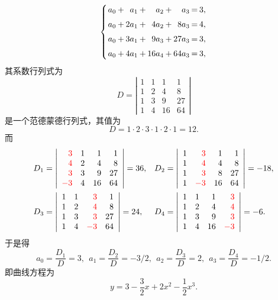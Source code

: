 \documentclass[10pt,a4paper%
tablecaptionabove]{article}
\newcommand{\red}{\textcolor{red}}
\begin{document}
\begin{CJK}{UTF8}{gkai}
\begin{jie}
      $$
      \setlength{\arraycolsep}{1.0pt}
      \left\{
      \begin{array}{rcrcrcrcr}
        a_0 & + &  a_1 & + &  a_2 & + &   a_3 & = & 3, \\[0.2cm]
        a_0 & + & 2a_1 & + & 4a_2 & + &  8a_3 & = & 4, \\[0.2cm]
        a_0 & + & 3a_1 & + & 9a_3 & + & 27a_3 & = & 3, \\[0.2cm]
        a_0 & + & 4a_1 & + &16a_4 & + & 64a_3 & = & 3,
      \end{array}
      \right.
      $$
      其系数行列式为
      $$
      D = \left|
      \begin{array}{rrrr}
        1 & 1 &  1 &  1 \\
        1 & 2 &  4 &  8 \\
        1 & 3 &  9 & 27 \\
        1 & 4 & 16 & 64
      \end{array}
      \right|
      $$
      是一个范德蒙德行列式，其值为
      $$ 
      D = 1\cdot 2 \cdot 3 \cdot 1 \cdot 2 \cdot 1 = 12.
      $$
      而
      $$
    \begin{array}{ll}
      D_1 = \left|
      \begin{array}{rrrr}
        \red{3}  &  1 &  1 &  1\\
        \red{4}  &  2 &  4 &  8\\
        \red{3}  &  3 &  9 & 27\\
        \red{-3} &  4 & 16 & 64
      \end{array}
      \right|= 36, &
      D_2 = \left|
      \begin{array}{rrrr}
        1 & \red{3}  & 1  &  1\\
        1 & \red{4}  & 4  &  8\\
        1 & \red{3}  & 8  &  27\\
        1 & \red{-3} & 16 &  64
      \end{array}
      \right|=-18,\\[0.8cm]
      D_3 = \left|
      \begin{array}{rrrr}
        1 & 1 & \red{3}  &  1 \\
        1 & 2 & \red{4}  &  8 \\
        1 & 3 & \red{3}  & 27 \\
        1 & 4 & \red{-3} & 64
      \end{array}
      \right|= 24, &
      D_4 = \left|
      \begin{array}{rrrr}
        1 & 1 &  1 & \red{3} \\
        1 & 2 &  4 & \red{4} \\
        1 & 3 &  9 & \red{3} \\
        1 & 4 & 16 & \red{-3}
      \end{array}
      \right|= -6.
    \end{array}
    $$
    于是得
    $$
    a_0 = \frac{D_1}D = 3,  \ \ 
    a_1 = \frac{D_2}D = -3/2, \ \ 
    a_2 = \frac{D_3}D = 2, \ \ 
    a_3 = \frac{D_4}D = -1/2.
    $$
    即曲线方程为
    $$
    y = 3 - \frac 32 x + 2 x^2 - \frac 12 x^3.
    $$
  \end{jie}
\end{CJK}
\end{document}
